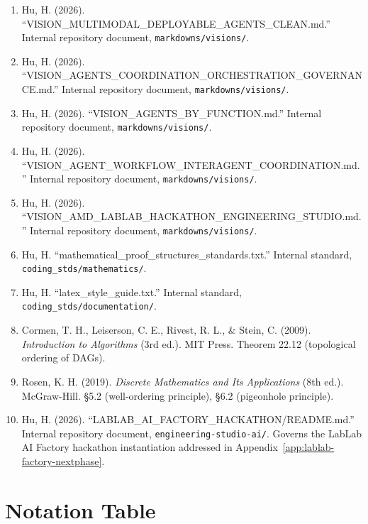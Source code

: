 \documentclass[12pt]{article}
\theoremstyle{definition}
\begin{document}
\begin{sloppypar}
\begin{enumerate}
    \item Hu, H. (2026). ``VISION\_MULTIMODAL\_\allowbreak DEPLOYABLE\_AGENTS\_CLEAN.md.''
          Internal repository document, \texttt{markdowns/visions/}.
    \item Hu, H. (2026). ``VISION\_AGENTS\_COORDINATION\_\allowbreak ORCHESTRATION\_\allowbreak GOVERNANCE.md.'' Internal repository document,
          \texttt{markdowns/visions/}.
    \item Hu, H. (2026). ``VISION\_AGENTS\_BY\_FUNCTION.md.'' Internal
          repository document, \texttt{markdowns/visions/}.
    \item Hu, H. (2026). ``VISION\_AGENT\_WORKFLOW\_INTERAGENT\_\allowbreak COORDINATION.md.'' Internal repository document,
          \texttt{markdowns/visions/}.
    \item Hu, H. (2026). ``VISION\_AMD\_LABLAB\_HACKATHON\_ENGINEERING\_\allowbreak STUDIO.md.'' Internal repository document,
          \texttt{markdowns/visions/}.
    \item Hu, H. ``mathematical\_proof\_\allowbreak structures\_standards.txt.''
          Internal standard, \texttt{coding\_stds/mathematics/}.
    \item Hu, H. ``latex\_style\_guide.txt.'' Internal standard,
          \texttt{coding\_stds/documentation/}.
    \item Cormen, T. H., Leiserson, C. E., Rivest, R. L., \& Stein, C.
          (2009). \textit{Introduction to Algorithms} (3rd ed.). MIT
          Press. Theorem 22.12 (topological ordering of DAGs).
    \item Rosen, K. H. (2019). \textit{Discrete Mathematics and Its
          Applications} (8th ed.). McGraw-Hill. \S5.2 (well-ordering
          principle), \S6.2 (pigeonhole principle).
    \item Hu, H. (2026). ``LABLAB\_AI\_FACTORY\_HACKATHON/README.md.''
          Internal repository document,
          \texttt{engineering-studio-ai/}. Governs the LabLab AI
          Factory hackathon instantiation addressed in
          Appendix~\ref{app:lablab-factory-nextphase}.
\end{enumerate}
\end{sloppypar}

\newpage
\appendix
\section{Notation Table}
\label{app:notation}
\end{document}
